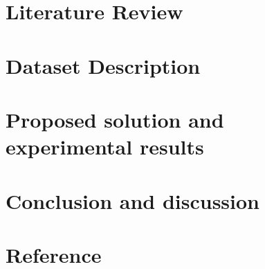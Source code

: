 \documentclass{article}
\begin{document}
\section{Literature Review}
\section{Dataset Description}
\section{Proposed solution and experimental results}
\section{Conclusion and discussion}
\section{Reference}
\end{document}
